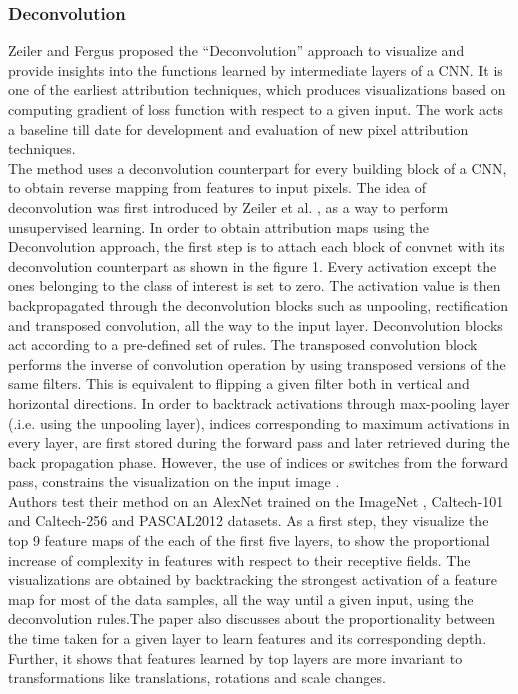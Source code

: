 \documentclass[../report.tex]{subfiles}
\begin{document}
    \subsubsection{Deconvolution}
    Zeiler and Fergus proposed the \enquote{Deconvolution} approach to visualize and provide insights into the functions learned by intermediate layers of a CNN. It is one of the earliest attribution techniques, which produces visualizations based on computing gradient of loss function with respect to a given input. The work acts a baseline till date for development and evaluation of new pixel attribution techniques.\\
    The method uses a deconvolution counterpart for every building block of a CNN, to obtain reverse mapping from features to input pixels. The idea of deconvolution was first introduced by Zeiler et al. \cite{zeiler2011adaptive}, as a way to perform unsupervised learning. In order to obtain attribution maps using the Deconvolution approach, the first step is to attach each block of convnet with its deconvolution counterpart as shown in the figure 1. Every activation except the ones belonging to the class of interest is set to zero. The activation value is then backpropagated through the deconvolution blocks such as unpooling, rectification and transposed convolution, all the way to the input layer. Deconvolution blocks act according to a pre-defined set of rules. The transposed convolution block performs the inverse of convolution operation by using transposed versions of the same filters. This is equivalent to flipping a given filter both in vertical and horizontal directions. In order to backtrack activations through max-pooling layer (.i.e. using the unpooling layer), indices corresponding to maximum activations in every layer, are first stored during the forward pass and later retrieved during the back propagation phase. However, the use of indices or switches from the forward pass, constrains the visualization on the input image \cite {guided_backprop}.\\ 
    Authors test their method on an AlexNet \cite{} trained on the ImageNet \cite{krizhevsky2012imagenet}, Caltech-101 \cite{} and Caltech-256 \cite{} and PASCAL2012 \cite{} datasets. As a first step, they visualize the top 9 feature maps of the each of the first five layers, to show the proportional increase of complexity in features with respect to their receptive fields. The visualizations are obtained by backtracking the strongest activation of a feature map for most of the data samples, all the way until a given input, using the deconvolution rules.The paper also discusses about the proportionality between the time taken for a given layer to learn features and its corresponding depth. Further, it shows that features learned by top layers are more invariant to transformations like translations, rotations and scale changes.\\
\end{document}
